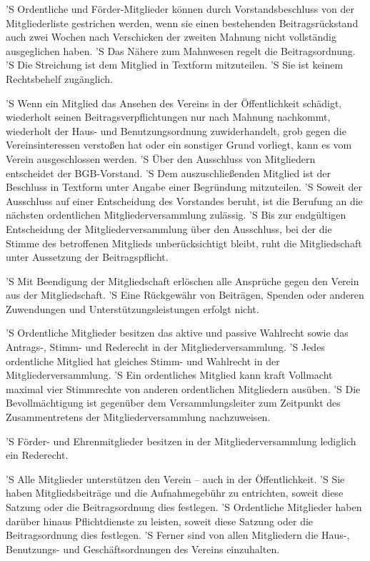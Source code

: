 \documentclass[a4paper,10pt]{scrreprt}
\begin{document}
\begin{contract}
'S Ordentliche und Förder-Mitglieder können durch Vorstandsbeschluss von der
Mitgliederliste gestrichen werden, wenn sie einen bestehenden Beitragsrückstand
auch zwei Wochen nach Verschicken der zweiten Mahnung nicht vollständig
ausgeglichen haben.
'S Das Nähere zum Mahnwesen regelt die Beitragsordnung.
'S Die Streichung ist dem Mitglied in Textform mitzuteilen.
'S Sie ist keinem Rechtsbehelf zugänglich.

'S Wenn ein Mitglied das Ansehen des Vereins in der Öffentlichkeit schädigt,
wiederholt seinen Beitragsverpflichtungen nur nach Mahnung nachkommt,
wiederholt der Haus- und Benutzungsordnung zuwiderhandelt, grob gegen die
Vereinsinteressen verstoßen hat oder ein sonstiger Grund vorliegt, kann es vom
Verein ausgeschlossen werden.
'S Über den Ausschluss von Mitgliedern entscheidet der BGB-Vorstand.
'S Dem auszuschließenden Mitglied ist der Beschluss in Textform unter Angabe
einer Begründung mitzuteilen.
'S Soweit der Ausschluss auf einer Entscheidung des Vorstandes beruht, ist die
Berufung an die nächsten ordentlichen Mitgliederversammlung zulässig.
'S Bis zur endgültigen Entscheidung der Mitgliederversammlung über den
Ausschluss, bei der die Stimme des betroffenen Mitglieds unberücksichtigt
bleibt, ruht die Mitgliedschaft unter Aussetzung der Beitragspflicht.

'S Mit Beendigung der Mitgliedschaft erlöschen alle Ansprüche gegen den Verein
aus der Mitgliedschaft.
'S Eine Rückgewähr von Beiträgen, Spenden oder anderen Zuwendungen und
Unterstützungsleistungen erfolgt nicht.


'S Ordentliche Mitglieder besitzen das aktive und passive Wahlrecht sowie das
Antrags-, Stimm- und Rederecht in der Mitgliederversammlung.
'S Jedes ordentliche Mitglied hat gleiches Stimm- und Wahlrecht in der
Mitgliederversammlung.
'S Ein ordentliches Mitglied kann kraft Vollmacht maximal vier Stimmrechte von
anderen ordentlichen Mitgliedern ausüben.
'S Die Bevollmächtigung ist gegenüber dem Versammlungsleiter zum Zeitpunkt des
Zusammentretens der Mitgliederversammlung nachzuweisen.

'S Förder- und Ehrenmitglieder besitzen in der Mitgliederversammlung lediglich
ein Rederecht.

'S Alle Mitglieder unterstützen den Verein – auch in der Öffentlichkeit.
'S Sie haben Mitgliedsbeiträge und die Aufnahmegebühr zu entrichten, soweit
diese Satzung oder die Beitragsordnung dies festlegen.
'S Ordentliche Mitglieder haben darüber hinaus Pflichtdienste zu leisten,
soweit diese Satzung oder die Beitragsordnung dies festlegen.
'S Ferner sind von allen Mitgliedern die Haus-, Benutzungs- und
Geschäftsordnungen des Vereins einzuhalten.


\end{contract}
\end{document}
